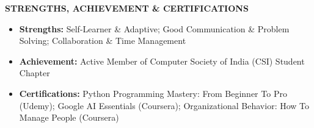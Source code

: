 \documentclass[12pt]{extarticle}
\newcommand{\sectiontitle}[1]{%
  \vspace{0.08em}
  \noindent\colorbox{sectiongray}{\parbox{\dimexpr\textwidth-2\fboxsep}{\textbf{#1}}}
  \vspace{0.05em}
}
\begin{document}
\sectiontitle{STRENGTHS, ACHIEVEMENT \& CERTIFICATIONS}

\begin{itemize}
    \item \textbf{Strengths:} Self-Learner \& Adaptive; Good Communication \& Problem Solving; Collaboration \& Time Management
    \item \textbf{Achievement:} Active Member of Computer Society of India (CSI) Student Chapter
    \item \textbf{Certifications:} Python Programming Mastery: From Beginner To Pro (Udemy); Google AI Essentials (Coursera); Organizational Behavior: How To Manage People (Coursera)
\end{itemize}
\end{document}
